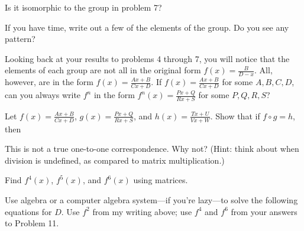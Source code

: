 \documentclass[../key.tex]{subfiles}
\begin{document}
\begin{inner_problem}
\item Is it isomorphic to the group in problem 7?
\end{inner_problem}

\begin{inner_problem}
\item If you have time, write out a few of the elements of the group. Do you see any pattern?
\end{inner_problem}

\begin{outer_problem}
\item Looking back at your results to problems 4 through 7, you will notice that the elements of each group are not all in the original form $f(x)=\frac{B}{D-x}$. All, however, are in the form $f(x)=\frac{Ax+B}{Cx+D}$. If $f(x)=\frac{Ax+B}{Cx+D}$ for some $A,B,C,D$, can you always write $f^n$ in the form $f^n(x)=\frac{Px+Q}{Rx+S}$ for some $P,Q,R,S$?
\end{outer_problem}

\begin{outer_problem}
\item
\end{outer_problem}

\begin{inner_problem}[start=1]
\item Let $f(x)=\frac{Ax+B}{Cx+D}$, $g(x)=\frac{Px+Q}{Rx+S}$, and $h(x)=\frac{Tx+U}{Vx+W}$. Show that if $f\circ g = h$, then
\end{inner_problem}

\begin{inner_problem}
\item This is not a true one-to-one correspondence. Why not? (Hint: think about when division is undefined, as compared to matrix multiplication.)
\end{inner_problem}

\begin{outer_problem}
\item Find $f^4(x)$, $f^5(x)$, and $f^6(x)$ using matrices.
\end{outer_problem}

\begin{outer_problem}
\item Use algebra or a computer algebra system---if you're lazy---to solve the following equations for $D$. Use $f^2$ from my writing above; use $f^4$ and $f^6$ from your answers to Problem 11.
\end{outer_problem}
\end{document}

